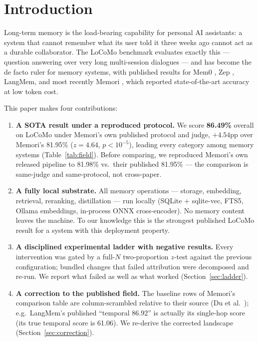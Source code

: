 \documentclass[11pt]{article}
\newcommand{\best}[1]{\textbf{#1}}
\begin{document}
\section{Introduction}

Long-term memory is the load-bearing capability for personal AI
assistants: a system that cannot remember what its user told it three
weeks ago cannot act as a durable collaborator. The LoCoMo benchmark
\cite{locomo} evaluates exactly this --- question answering over very
long multi-session dialogues --- and has become the de facto ruler for
memory systems, with published results for Mem0 \cite{mem0}, Zep
\cite{zep}, LangMem, and most recently Memori \cite{memori}, which
reported state-of-the-art accuracy at low token cost.

This paper makes four contributions:

\begin{enumerate}[leftmargin=1.4em]
\item \textbf{A SOTA result under a reproduced protocol.} We score
  \best{86.49\%} overall on LoCoMo under Memori's own published
  protocol and judge, $+4.54$pp over Memori's 81.95\% ($z{=}4.64$,
  $p{<}10^{-5}$), leading every category among memory systems
  (Table~\ref{tab:field}). Before comparing, we reproduced Memori's
  own released pipeline to 81.98\% vs.\ their published 81.95\% ---
  the comparison is same-judge and same-protocol, not cross-paper.
\item \textbf{A fully local substrate.} All memory operations ---
  storage, embedding, retrieval, reranking, distillation --- run
  locally (SQLite + sqlite-vec, FTS5, Ollama embeddings, in-process
  ONNX cross-encoder). No memory content leaves the machine. To our
  knowledge this is the strongest published LoCoMo result for a
  system with this deployment property.
\item \textbf{A disciplined experimental ladder with negative
  results.} Every intervention was gated by a full-$N$
  two-proportion $z$-test against the previous configuration; bundled
  changes that failed attribution were decomposed and re-run. We
  report what failed as well as what worked
  (Section~\ref{sec:ladder}).
\item \textbf{A correction to the published field.} The baseline rows
  of Memori's comparison table are column-scrambled relative to their
  source (Du et al.\ \cite{memr3}); e.g.\ LangMem's published
  ``temporal 86.92'' is actually its single-hop score (its true
  temporal score is 61.06). We re-derive the corrected landscape
  (Section~\ref{sec:correction}).
\end{enumerate}
\end{document}
